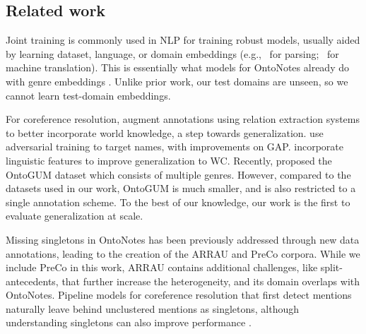 \documentclass[12pt]{thesis-umich}[thesis]
\begin{document}
\subsection{Related work}
Joint training is commonly used in NLP for training robust models,
usually aided by learning dataset, language, or domain embeddings
(e.g.,~\cite{stymne-etal-2018-parser} for parsing;~\cite{kobus-etal-2017-domain, tan-etal-2019-multilingual} for machine translation). This is essentially what models for OntoNotes already do with genre embeddings \cite{lee-etal-2017-end}. Unlike prior work, our test domains are 
unseen, so we cannot 
learn test-domain embeddings. 

For coreference resolution, \citet{aralikatte-etal-2019-rewarding} augment annotations using relation extraction systems to better incorporate world knowledge, a step towards generalization. \citet{subramanian-roth-2019-improving} use adversarial training to target names, with improvements on GAP. 
\citet{moosavi-strube-2018-using} incorporate linguistic features to improve generalization to WC.
Recently, \citet{zhu-etal-2021-ontogum} proposed the OntoGUM dataset which consists of multiple genres. However, compared to the datasets used in our work, OntoGUM is much smaller, and is also restricted to a single annotation scheme.
To the best of our knowledge, our work is the first to evaluate generalization at scale. 

Missing singletons in OntoNotes has been previously addressed through new data annotations, leading to the creation of the ARRAU \cite{poesio-etal-2018-anaphora} and PreCo \cite{chen-etal-2018-preco} corpora. While we include PreCo in this work, ARRAU contains additional challenges, like split-antecedents, that further increase the heterogeneity, and its domain overlaps with OntoNotes. Pipeline models for coreference resolution 
that first detect mentions naturally leave behind unclustered mentions as singletons, although understanding singletons can also 
improve performance \cite{recasens-etal-2013-life}. 
\end{document}
